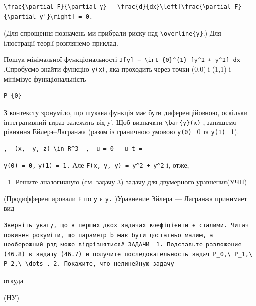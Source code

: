 \documentclass[
  ukrainian,
]{article}
\providecommand{\tightlist}{%
  \setlength{\itemsep}{0pt}\setlength{\parskip}{0pt}}
\begin{document}
\begin{verbatim}
\frac{\partial F}{\partial y} - \frac{d}{dx}\left[\frac{\partial F}{\partial y'}\right] = 0.
\end{verbatim}

(Для спрощення позначень ми прибрали риску над
\texttt{\textbackslash{}overline\{y\}}.) Для ілюстрації теорії
розглянемо приклад.

Пошук мінімальної функціональності
\texttt{J{[}y{]}\ =\ \textbackslash{}int\_\{0\}\^{}\{1\}\ {[}y\^{}2\ +\ y\textquotesingle{}\^{}2{]}\ dx}
.Спробуємо знайти функцію \texttt{y(x)}, яка проходить через точки (0,0)
і (1,1) і мінімізує функціональність

\begin{verbatim}
P_{0}
\end{verbatim}

З контексту зрозуміло, що шукана функція має бути диференційовною,
оскільки інтегративний вираз залежить від y'. Щоб визначити
\texttt{\textbackslash{}bar\{y\}(x)} , запишемо рівняння
Ейлера--Лагранжа (разом із граничною умовою \texttt{y(0)}=0 та
\texttt{y(1)}=1).

\begin{verbatim}
,  (x,  y, z) \in R^3  ,  u = 0   u_t =
\end{verbatim}

\texttt{y(0)\ =\ 0,} \texttt{y(1)\ =\ 1.} Але
\texttt{F(x,\ y,\ y\textquotesingle{})\ =\ y\^{}2\ +\ y\textquotesingle{}\^{}2}
і, отже,

\begin{enumerate}
\def\labelenumi{\arabic{enumi}.}
\setcounter{enumi}{3}
\tightlist
\item
  Решите аналогичную (см. задачу 3) задачу для двумерного уравнения(УЧП)
\end{enumerate}

(Продифференцировали \texttt{F} по \texttt{y} и
\texttt{y\textquotesingle{}.} )Уравнение Эйлера --- Лагранжа принимает
вид

\begin{verbatim}
Зверніть увагу, що в перших двох задачах коефіцієнти є сталими. Читач повинен розуміти, що параметр b має бути достатньо малим, а необережний ряд може відрізнятися# ЗАДАЧИ- 1. Подставьте разложение (46.8) в задачу (46.7) и получите последовательность задач P_0,\ P_1,\ P_2,\ \dots . 2. Покажите, что нелинейную задачу
\end{verbatim}

откуда

(НУ)
\end{document}
